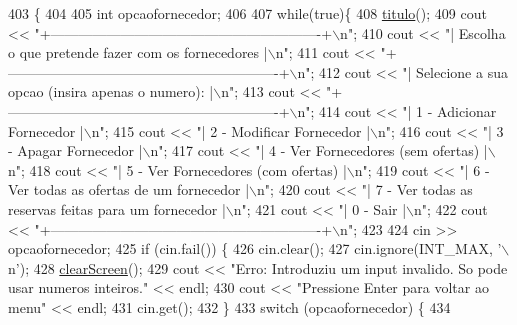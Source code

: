 \begin{DoxyCode}
403                              \{
404 
405     \textcolor{keywordtype}{int} opcaofornecedor;
406 
407     \textcolor{keywordflow}{while}(\textcolor{keyword}{true})\{
408     \hyperlink{classEmpresa_ad79f7196a8ce7256771cbd7b9542155c}{titulo}();
409     cout << \textcolor{stringliteral}{"+----------------------------------------------------------+\(\backslash\)n"};
410     cout << \textcolor{stringliteral}{"| Escolha o que pretende fazer com os fornecedores         |\(\backslash\)n"};
411     cout << \textcolor{stringliteral}{"+----------------------------------------------------------+\(\backslash\)n"};
412     cout << \textcolor{stringliteral}{"| Selecione a sua opcao (insira apenas o numero):          |\(\backslash\)n"};
413     cout << \textcolor{stringliteral}{"+----------------------------------------------------------+\(\backslash\)n"};
414     cout << \textcolor{stringliteral}{"| 1 - Adicionar Fornecedor                                 |\(\backslash\)n"};
415     cout << \textcolor{stringliteral}{"| 2 - Modificar Fornecedor                                 |\(\backslash\)n"};
416     cout << \textcolor{stringliteral}{"| 3 - Apagar Fornecedor                                    |\(\backslash\)n"};
417     cout << \textcolor{stringliteral}{"| 4 - Ver Fornecedores (sem ofertas)                       |\(\backslash\)n"};
418     cout << \textcolor{stringliteral}{"| 5 - Ver Fornecedores (com ofertas)                       |\(\backslash\)n"};
419     cout << \textcolor{stringliteral}{"| 6 - Ver todas as ofertas de um fornecedor                |\(\backslash\)n"};
420     cout << \textcolor{stringliteral}{"| 7 - Ver todas as reservas feitas para um fornecedor      |\(\backslash\)n"};
421     cout << \textcolor{stringliteral}{"| 0 - Sair                                                 |\(\backslash\)n"};
422     cout << \textcolor{stringliteral}{"+----------------------------------------------------------+\(\backslash\)n"};
423 
424     cin >> opcaofornecedor;
425     \textcolor{keywordflow}{if} (cin.fail()) \{
426         cin.clear();
427         cin.ignore(INT\_MAX, \textcolor{charliteral}{'\(\backslash\)n'});
428         \hyperlink{menu_8h_aceb70c1ed7e11f0863a868704f02214b}{clearScreen}();
429         cout << \textcolor{stringliteral}{"Erro: Introduziu um input invalido. So pode usar numeros inteiros."} << endl;
430         cout << \textcolor{stringliteral}{"Pressione Enter para voltar ao menu"} << endl;
431         cin.get();
432     \}
433     \textcolor{keywordflow}{switch} (opcaofornecedor) \{
434 

\end{DoxyCode}
